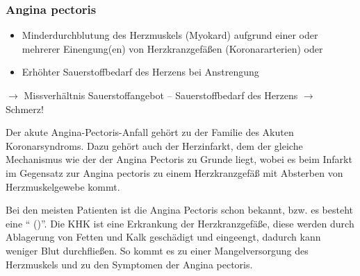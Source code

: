\subsubsection[Angina pectoris]{Angina pectoris}


\begin{itemize}
  \item Minderdurchblutung des Herzmuskels (Myokard) aufgrund einer oder
  mehrerer Einengung(en) von Herzkranzgefäßen (Koronararterien)
  oder
  \item Erhöhter Sauerstoffbedarf des Herzens bei Anstrengung
\end{itemize}
{\mdseries
${\rightarrow}$ Missverhältnis Sauerstoffangebot -- 
Sauerstoffbedarf des Herzens ${\rightarrow}$ Schmerz!}

Der akute Angina-Pectoris-Anfall gehört zu der Familie des Akuten
Koronarsyndroms. Dazu gehört auch der Herzinfarkt, dem der gleiche
Mechanismus wie der der Angina Pectoris zu Grunde liegt, wobei es beim Infarkt
im Gegensatz zur Angina pectoris zu einem 
Herzkranzgefäß mit Absterben von Herzmuskelgewebe kommt.

Bei den meisten Patienten ist die Angina Pectoris schon bekannt, bzw. es
besteht eine "`
()"'. Die KHK ist
eine Erkrankung der Herzkranzgefäße, diese werden durch
Ablagerung von Fetten und Kalk geschädigt und eingeengt, dadurch kann
weniger Blut durchfließen. So kommt es zu einer Mangelversorgung
des Herzmuskels und zu den Symptomen der Angina pectoris.  


